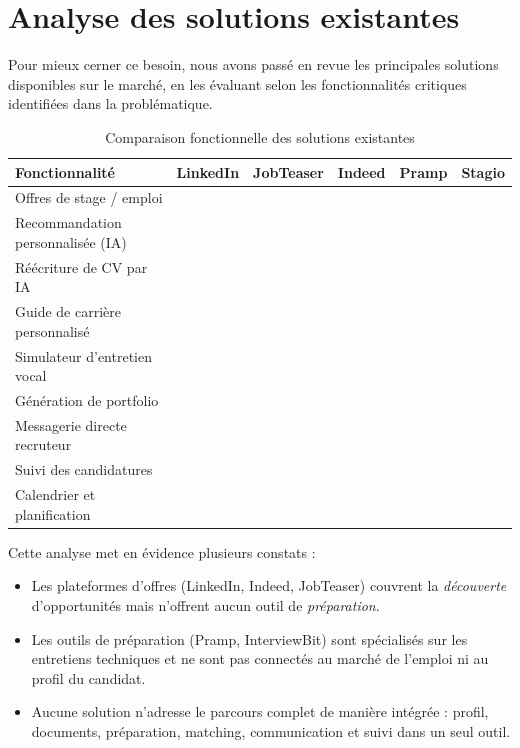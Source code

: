 ﻿\documentclass[12pt,a4paper]{report}
\newcommand{\cmark}{\ding{51}}
\newcommand{\xmark}{\ding{55}}
\begin{document}
\section{Analyse des solutions existantes}

Pour mieux cerner ce besoin, nous avons passé en revue les principales solutions disponibles sur le marché, en les évaluant selon les fonctionnalités critiques identifiées dans la problématique.

\begin{table}[H]
\centering
\begin{tabular}{lccccc}
\toprule
\textbf{Fonctionnalité} & \textbf{LinkedIn} & \textbf{JobTeaser} & \textbf{Indeed} & \textbf{Pramp} & \textbf{Stagio} \\
\midrule
Offres de stage / emploi          & \cmark & \cmark & \cmark & \xmark & \cmark \\
Recommandation personnalisée (IA) & \xmark & \xmark & \xmark & \xmark & \cmark \\
Réécriture de CV par IA           & \xmark & \xmark & \xmark & \xmark & \cmark \\
Guide de carrière personnalisé    & \xmark & \xmark & \xmark & \xmark & \cmark \\
Simulateur d'entretien vocal      & \xmark & \xmark & \xmark & \xmark & \cmark \\
Génération de portfolio           & \xmark & \xmark & \xmark & \xmark & \cmark \\
Messagerie directe recruteur      & \cmark & \xmark & \xmark & \xmark & \cmark \\
Suivi des candidatures            & \xmark & \cmark & \xmark & \xmark & \cmark \\
Calendrier et planification       & \xmark & \xmark & \xmark & \xmark & \cmark \\
\bottomrule
\end{tabular}
\caption{Comparaison fonctionnelle des solutions existantes}
\end{table}

Cette analyse met en évidence plusieurs constats :

\begin{itemize}
  \item Les plateformes d'offres (LinkedIn, Indeed, JobTeaser) couvrent la \textit{découverte} d'opportunités mais n'offrent aucun outil de \textit{préparation}.
  \item Les outils de préparation (Pramp, InterviewBit) sont spécialisés sur les entretiens techniques et ne sont pas connectés au marché de l'emploi ni au profil du candidat.
  \item Aucune solution n'adresse le parcours complet de manière intégrée : profil, documents, préparation, matching, communication et suivi dans un seul outil.
\end{itemize}
\end{document}
